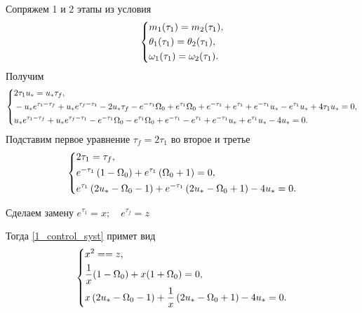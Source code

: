 \documentclass[a4paper,12pt, openany]{book}
\theoremstyle{plain} %
\theoremstyle{definition} %
\theoremstyle{remark} %
\numberwithin{equation}{chapter}
\begin{document}
{Сопряжем 1 и 2 этапы из условия
\[
    \left\{ {\begin{aligned}
                 & m_1(\tau_1) = m_2(\tau_1), \hfill            \\
                 & \theta_1(\tau_1) =  \theta_2(\tau_1), \hfill \\
                 & \omega_1(\tau_1) = \omega_2(\tau_1) . \hfill \\
            \end{aligned}} \right.
\]
Получим
\[
    \left\{ {\begin{aligned}
                 & 2 \tau _1 u_*=u_* \tau _f, \hfill            \\
                 & -u_* e^{\tau _1-\tau _f}+u_* e^{\tau _f-\tau _1}-2 u_* \tau _f-e^{-\tau _1} \Omega _0+e^{\tau _1} \Omega _0+e^{-\tau _1}+e^{\tau _1}+e^{-\tau _1} u_*-e^{\tau _1} u_*+4 \tau _1 u_*=0, \hfill \\
                 & u_* e^{\tau _1-\tau _f}+u_* e^{\tau _f-\tau _1}-e^{-\tau _1} \Omega _0-e^{\tau _1} \Omega _0+e^{-\tau _1}-e^{\tau _1}+e^{-\tau _1} u_*+e^{\tau _1} u_*-4 u_*=0. \hfill \\
            \end{aligned}} \right.
\]
Подставим первое уравнение $\tau_f=2\tau_1$ во второе и третье
\begin{equation}\label{1_control_syst}
    \left\{ {\begin{aligned}
                 & 2 \tau _1=\tau _f, \hfill            \\
                 & e^{-\tau _1} \left(1-\Omega _0\right)+e^{\tau _1} \left(\Omega _0+1\right)=0, \hfill \\
                 & e^{\tau _1} \left(2 u_*-\Omega _0-1\right)+e^{-\tau _1} \left(2 u_*-\Omega _0+1\right)-4 u_*=0. \hfill \\
            \end{aligned}} \right.
\end{equation}
            
Сделаем замену $e^{\tau_1}=x;\quad e^{\tau_f}=z$

Тогда \eqref{1_control_syst} примет вид
\begin{equation}\label{1_control_syst_subst}
    \left\{ {\begin{aligned}
                 & x^2 == z, \hfill            \\
                 & \dfrac{1}{x}(1-\Omega_0)+x(1+\Omega_0)=0, \hfill \\
                 & x \left(2 u_*-\Omega _0-1\right)+\dfrac{1}{x}\left(2 u_*-\Omega _0+1\right)-4 u_*=0. \hfill \\
            \end{aligned}} \right.
\end{equation}

}
\end{document}
